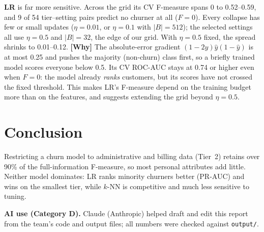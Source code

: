 \documentclass[sigconf,nonacm]{acmart}
\begin{document}
\textbf{LR} is far more sensitive. Across the grid its CV F-measure spans 0 to 0.52--0.59, and 9 of 54 tier--setting pairs predict no churner at all ($F=0$). Every collapse has few or small updates ($\eta=0.01$, or $\eta=0.1$ with $|B|=512$); the selected settings all use $\eta=0.5$ and $|B|=32$, the edge of our grid. With $\eta=0.5$ fixed, the spread shrinks to 0.01--0.12. \textbf{[Why]} The absolute-error gradient $(1-2y)\hat y(1-\hat y)$ is at most 0.25 and pushes the majority (non-churn) class first, so a briefly trained model scores everyone below 0.5. Its CV ROC-AUC stays at 0.74 or higher even when $F=0$: the model already \emph{ranks} customers, but its scores have not crossed the fixed threshold. This makes LR's F-measure depend on the training budget more than on the features, and suggests extending the grid beyond $\eta=0.5$.

\section{Conclusion}
Restricting a churn model to administrative and billing data (Tier~2) retains over 90\% of the full-information F-measure, so most personal attributes add little. Neither model dominates: LR ranks minority churners better (PR-AUC) and wins on the smallest tier, while $k$-NN is competitive and much less sensitive to tuning.

\textbf{AI use (Category D).} Claude (Anthropic) helped draft and edit this report from the team's code and output files; all numbers were checked against \texttt{output/}.



\end{document}
